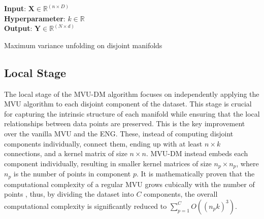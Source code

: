     \begin{algorithm}[ht]
    \DontPrintSemicolon
    \textbf{Input}: $\boldsymbol{X}\in\mathbb{R}^{(n\times D)}$ \\
    \textbf{Hyperparameter}: $k\in\mathbb{R}$\\
    \textbf{Output}: $\boldsymbol{Y}\in\mathbb{R}^{(N\times d)}$\\
    \caption{Maximum variance unfolding on disjoint manifolds}
    \label{alg:mvudm}
    \end{algorithm}
    
    


    \subsection{Local Stage}
        The local stage of the \ac{MVU-DM} algorithm focuses on independently applying the \ac{MVU} algorithm to each disjoint component of the dataset. This stage is crucial for capturing the intrinsic structure of each manifold while ensuring that the local relationships between data points are preserved. This is the key improvement over the vanilla \ac{MVU} and the \ac{ENG}. These, instead of computing disjoint components individually, connect them, ending up with at least $n \times k$ connections, and a kernel matrix of size $n \times n$. \ac{MVU-DM} instead embeds each component individually, resulting in smaller kernel matrices of size $n_p \times n_p$, where $n_p$ is the number of points in component $p$. It is mathematically proven that the computational complexity of a regular \ac{MVU} grows cubically with the number of points \cite{cube}, thus, by dividing the dataset into $C$ components, the overall computational complexity is significantly reduced to $\sum_{p=1}^{C} O((n_p k)^3)$.

